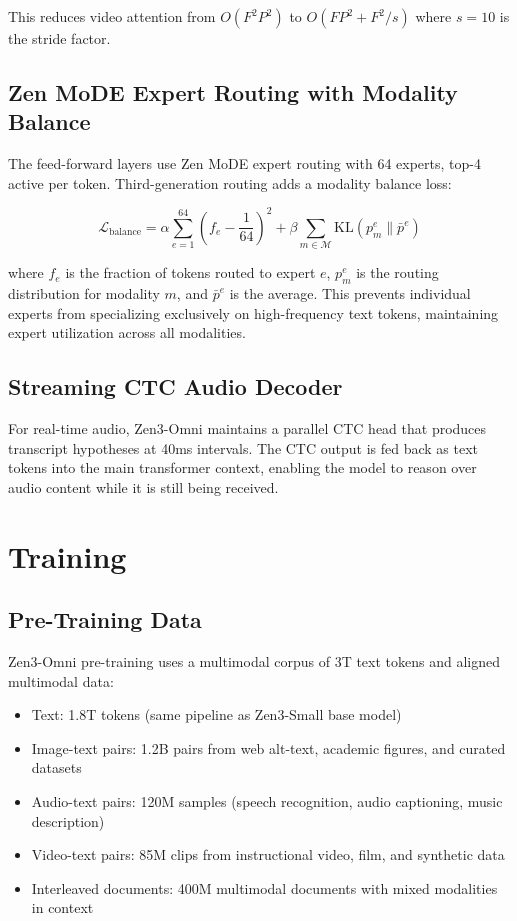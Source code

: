\documentclass[11pt,a4paper]{article}
\begin{document}
This reduces video attention from $O(F^2 P^2)$ to $O(F P^2 + F^2 / s)$ where $s=10$
is the stride factor.

\subsection{Zen MoDE Expert Routing with Modality Balance}

The feed-forward layers use Zen MoDE expert routing with 64 experts, top-4 active
per token. Third-generation routing adds a modality balance loss:

\begin{equation}
\mathcal{L}_{\text{balance}} = \alpha \sum_{e=1}^{64} \left( f_e - \frac{1}{64} \right)^2 + \beta \sum_{m \in \mathcal{M}} \text{KL}(p_m^e \| \bar{p}^e)
\end{equation}

where $f_e$ is the fraction of tokens routed to expert $e$, $p_m^e$ is the routing
distribution for modality $m$, and $\bar{p}^e$ is the average. This prevents
individual experts from specializing exclusively on high-frequency text tokens,
maintaining expert utilization across all modalities.

\subsection{Streaming CTC Audio Decoder}

For real-time audio, Zen3-Omni maintains a parallel CTC head that produces
transcript hypotheses at 40ms intervals. The CTC output is fed back as text tokens
into the main transformer context, enabling the model to reason over audio content
while it is still being received.

\section{Training}
\label{sec:training}

\subsection{Pre-Training Data}

Zen3-Omni pre-training uses a multimodal corpus of 3T text tokens and aligned
multimodal data:

\begin{itemize}
\item Text: 1.8T tokens (same pipeline as Zen3-Small base model)
\item Image-text pairs: 1.2B pairs from web alt-text, academic figures, and curated datasets
\item Audio-text pairs: 120M samples (speech recognition, audio captioning, music description)
\item Video-text pairs: 85M clips from instructional video, film, and synthetic data
\item Interleaved documents: 400M multimodal documents with mixed modalities in context
\end{itemize}
\end{document}
